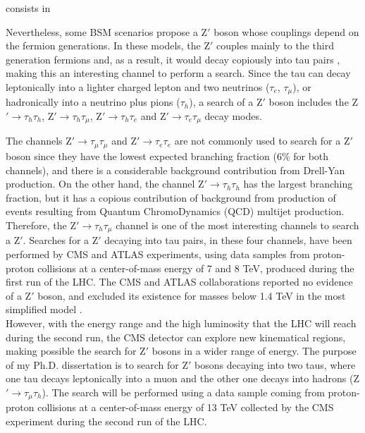 consists in 


Nevertheless, some BSM scenarios propose a Z$'$ boson
whose couplings depend on the fermion generations. In these models,
the Z$'$ couples mainly to the third generation fermions and, as a result,
it would decay copiously into tau pairs \cite{Langacker:2009su}, making this
an interesting channel to perform a search. Since the tau can decay
leptonically into a lighter charged lepton and two neutrinos ($\tau_{e}$, $\tau_{\mu}$), or
hadronically into a neutrino plus pions ($\tau_{h}$), a search of a Z$'$ boson
includes the Z$'\rightarrow\tau_{h}\tau_{h}$, Z$'\rightarrow\tau_{h}\tau_{\mu}$,
 Z$'\rightarrow\tau_{h}\tau_{e}$ and Z$'\rightarrow\tau_{e}\tau_{\mu}$ decay modes. 
 
 The channels Z$'\rightarrow\tau_{\mu}\tau_{\mu}$ and Z$'\rightarrow\tau_{e}\tau_{e}$ are
 not commonly used to search for a Z$'$ boson since they have the lowest expected branching fraction  ($6\%$ for both channels),
 and there is a considerable background contribution from Drell-Yan production. On the other hand,
 the channel Z$'\rightarrow\tau_{h}\tau_{h}$ has the largest branching fraction, but
 it has a copious contribution of background from production of events resulting from
 Quantum ChromoDynamics (QCD) multijet production. Therefore,
 the Z$'\rightarrow\tau_{h}\tau_{\mu}$ channel is one of the most interesting
 channels to search a Z$'$. Searches for a Z$'$ decaying
  into tau pairs, in these four channels, have been performed by CMS and ATLAS
experiments, using data samples from proton-proton collisions at a center-of-mass energy   %
of 7 and 8 TeV, produced during the first run of the LHC. The CMS and ATLAS collaborations
reported no evidence of a Z$'$ boson, and excluded its existence for
masses below 1.4 TeV in the most simplified model \cite{CMSZprime2ditaubib,ATLASZprime2ditaubib}. \\

However, with the energy range and the high luminosity that the LHC will reach during the second run,
the CMS detector can explore new kinematical regions, making possible
the search for Z$'$ bosons in a wider range of energy. The purpose of my Ph.D. dissertation
is to search for Z$'$ bosons decaying into two taus, where one tau
decays leptonically into a muon and the other one decays into hadrons (Z$'\rightarrow \tau_{\mu}\tau_{h}$). The search
will be performed using a data sample coming from proton-proton collisions at a center-of-mass energy
of 13 TeV collected by the CMS experiment during the second run of the LHC. \\

